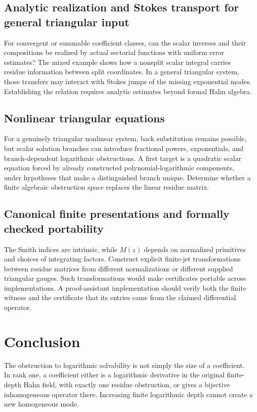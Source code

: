 \documentclass[11pt,a4paper]{article}
\numberwithin{equation}{section}
\theoremstyle{definition}
\theoremstyle{remark}\newtheorem{remark}[theorem]{Remark}
\begin{document}
\subsection{Analytic realization and Stokes transport for general triangular input}
For convergent or summable coefficient classes, can the scalar inverses and their compositions be realized by actual sectorial functions with uniform error estimates? The mixed example shows how a nonsplit scalar integral carries residue information between split coordinates. In a general triangular system, those transfers may interact with Stokes jumps of the missing exponential modes. Establishing the relation requires analytic estimates beyond formal Hahn algebra.

\subsection{Nonlinear triangular equations}
For a genuinely triangular nonlinear system, back substitution remains possible, but scalar solution branches can introduce fractional powers, exponentials, and branch-dependent logarithmic obstructions. A first target is a quadratic scalar equation forced by already constructed polynomial-logarithmic components, under hypotheses that make a distinguished branch unique. Determine whether a finite algebraic obstruction space replaces the linear residue matrix.

\subsection{Canonical finite presentations and formally checked portability}
The Smith indices are intrinsic, while $M(z)$ depends on normalized primitives and choices of integrating factors. Construct explicit finite-jet transformations between residue matrices from different normalizations or different supplied triangular gauges. Such transformations would make certificates portable across implementations. A proof-assistant implementation should verify both the finite witness and the certificate that its entries came from the claimed differential operator.

\section{Conclusion}
The obstruction to logarithmic solvability is not simply the size of a coefficient. In rank one, a coefficient either is a logarithmic derivative in the original finite-depth Hahn field, with exactly one residue obstruction, or gives a bijective inhomogeneous operator there. Increasing finite logarithmic depth cannot create a new homogeneous mode.
\end{document}
